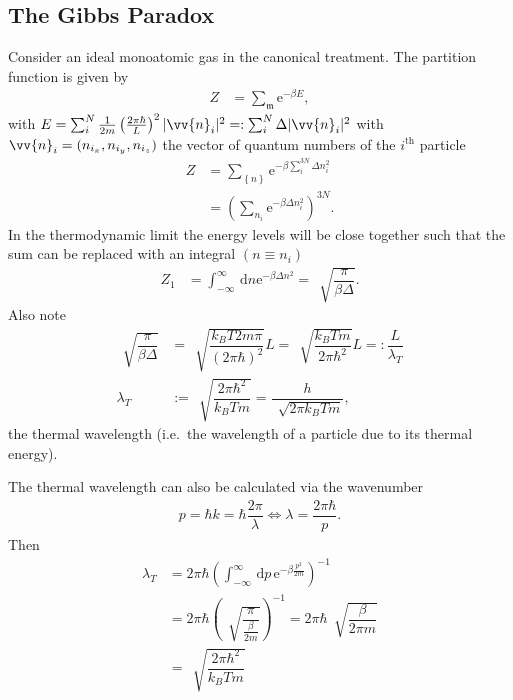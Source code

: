 \documentclass[a4paper,10pt]{article}
\newcommand{\td}{\,\text{d}}
\numberwithin{equation}{section}
\begin{document}
\begin{multicols}{2}
\subsection{The Gibbs Paradox}
Consider an ideal monoatomic gas in the canonical treatment.
The partition function is given by
\begin{align} 
  Z &= \sum_{\mathfrak{m}}^{}\text{e}^{-\beta E}
,\end{align} 
with $E=\sum_{i}^{N}\tfrac{1}{2m}\left(\tfrac{2\pi \hbar }{L}\right)^2|\vv{n}_i|^2=:\sum_{i}^{N}\Delta |\vv{n}_i|^2$ with $\vv{n}_i=(n_{i_x}, n_{i_y}, n_{i_z})$ the vector of quantum numbers of the $i^\text{th}$ particle
\begin{align} 
  Z &= \sum_{ \left\{n\right\}}^{}\text{e}^{-\beta \sum_{i}^{3N}\Delta n_i^2}\\
    &= \left(\sum_{n_i}^{}\text{e}^{-\beta \Delta n_i^2}\right)^{3N}
.\end{align} 
In the thermodynamic limit the energy levels will be close together such that the sum can be replaced with an integral $(n\equiv n_i)$ 
\begin{align} 
  Z_1 &= \int_{-\infty}^{\infty}\td n \text{e}^{-\beta \Delta n^2} = \,\sqrt[]{\dfrac{\pi }{\beta \Delta }}
.\end{align} 
Also note
\begin{align} 
  \,\sqrt[]{\dfrac{\pi }{\beta \Delta }} &= \,\sqrt[]{\dfrac{k_BT2m\pi }{(2\pi \hbar )^2}}L = \,\sqrt[]{\dfrac{k_BTm}{2\pi \hbar ^2}}L =: \dfrac{L}{\lambda _T}\\
  \lambda _T &:= \,\sqrt[]{\dfrac{2\pi \hbar ^2}{k_BTm}} = \dfrac{h}{\,\sqrt[]{2\pi k_BTm}}
,\end{align} 
the thermal wavelength (i.e.\ the wavelength of a particle due to its thermal energy).

\footnotesize
The thermal wavelength can also be calculated via the wavenumber
\begin{align} 
  p = \hbar k = \hbar \dfrac{2\pi }{\lambda } \Leftrightarrow \lambda =\dfrac{2\pi \hbar }{p}
.\end{align} 
Then
\begin{align} 
  \lambda _T&= 2\pi \hbar \left(\int_{-\infty}^{\infty}\td p\, \text{e}^{-\beta \tfrac{p^2}{2m}}\right)^{-1}\\
            &= 2\pi \hbar \left(\,\sqrt[]{\dfrac{\pi }{\tfrac{\beta }{2m} }}\right)^{-1} = 2\pi \hbar \,\sqrt[]{\dfrac{\beta }{2\pi m}}\\
            &= \,\sqrt[]{\dfrac{2\pi \hbar ^2}{k_BTm}}
\end{align} 


\end{multicols}
\end{document}
